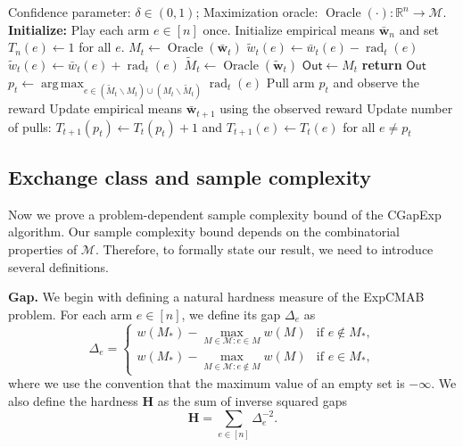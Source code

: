 \documentclass{article}
\newcommand{\Algorithm}{{\small \textsf{CGapExp}}\xspace}
\newcommand{\Problem}{{\small \textsf{ExpCMAB}}\xspace}
\newcommand{\M}{\mathcal M}
\newcommand{\del}{\backslash}
\newcommand{\RR}{\mathbb R}
\DeclareMathOperator{\rad}{rad}
\DeclareMathOperator*{\argmax}{arg\,max}
\DeclareMathOperator{\Oracle}{Oracle}
\newcommand{\out}{\mathsf{Out}}
\renewcommand{\vec}[1]{\boldsymbol{#1}}
\begin{document}
\begin{algorithm}[htbp]
{
\small
\begin{algorithmic}[1]
\Require Confidence parameter: $\delta \in (0,1)$; Maximization oracle: $\Oracle(\cdot): \RR^n \rightarrow \M$.
\Statex \textbf{Initialize:} Play each arm $e \in [n]$ once. Initialize empirical means $\vec {\bar w}_n$ and set $T_{n}(e) \gets 1$ for all $e$.
	\State $M_t \gets \Oracle(\vec {\bar w}_t)$
			\State $\tilde w_t(e) \gets \bar w_t(e)-\rad_t(e)$
		\Else
			\State $\tilde w_t(e) \gets \bar w_t(e)+\rad_t(e)$
		\EndIf
	\EndFor
	\State $\tilde M_t \gets \Oracle(\vec{\tilde w}_t)$
		\State $\out \gets M_t$
		\State \textbf{return} $\out$
	\EndIf
	\State $p_t \gets \argmax_{e\in (\tilde M_t \del M_t) \cup (M_t \del \tilde M_t)} \rad_t(e)$\label{algo:step:D}
	\State Pull arm $p_t$ and observe the reward
	\State Update empirical means $\vec {\bar w}_{t+1}$ using the observed reward
	\State Update number of pulls: $T_{t+1}(p_t)\gets T_{t}(p_t)+1$ and $T_{t+1}(e) \gets T_{t}(e)$ for all $e\not=p_t$
	\EndFor
\end{algorithmic}
\caption{\Algorithm: Combinatorial Gap Exploration}
\label{algo:pac}
}
\end{algorithm}


\subsection{Exchange class and sample complexity}
Now we prove a problem-dependent sample complexity bound of the \Algorithm algorithm. 
Our sample complexity bound depends on the combinatorial properties of $\M$. 
Therefore, to formally state our result, we need to introduce several definitions.

\textbf{Gap.} We begin with defining a natural hardness measure of the \Problem problem. 
For each arm $e \in [n]$, we define its gap $\Delta_e$ as
\begin{equation}
\label{eq:define-delta}
\Delta_e = \begin{cases}
			   w(M_*)-\max_{M\in \M: e\in M} w(M) & \text{if } e\not \in M_*, \\
			   w(M_*)-\max_{M\in \M: e\not \in M} w(M) & \text{if } e\in M_*,
			\end{cases}
\end{equation}
where we use the convention that the maximum value of an empty set is $-\infty$. 
We also define the hardness $\mathbf H$ as the sum of inverse squared gaps 
\begin{equation}
\label{eq:hardness}
\mathbf H =\sum_{e\in [n]} \Delta_e^{-2}.
\end{equation}
\end{document}
